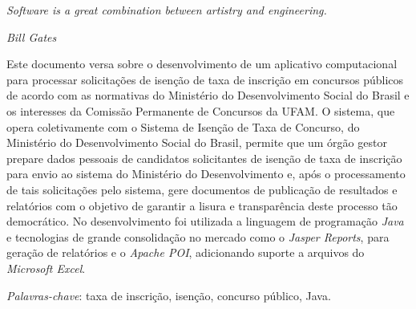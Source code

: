 \documentclass[
	12pt,			%
	openright,		%
	oneside,	
	a4paper,		%
	english,		%
	brazil			%
]{abntex2/abntex2}  %
\begin{document}
	\begin{epigrafe}
		
		\vspace*{\fill}
		\begin{flushright}
			
			\textit{Software is a great combination between artistry and engineering.}

			\textit{Bill Gates}
			
		\end{flushright}\vspace{4cm}
		
	\end{epigrafe}

	\setlength{\absparsep}{18pt}
	\begin{resumo}

		Este documento versa sobre o desenvolvimento de um aplicativo computacional para processar solicitações de isenção de taxa de inscrição em concursos públicos de acordo com as normativas do Ministério do Desenvolvimento Social do Brasil e os interesses da Comissão Permanente de Concursos da UFAM. O sistema, que opera coletivamente com o Sistema de Isenção de Taxa de Concurso, do Ministério do Desenvolvimento Social do Brasil, permite que um órgão gestor prepare dados pessoais de candidatos solicitantes de isenção de taxa de inscrição para envio ao sistema do Ministério do Desenvolvimento e, após o processamento de tais solicitações pelo sistema, gere documentos de publicação de resultados e relatórios com o objetivo de garantir a lisura e transparência deste processo tão democrático. No desenvolvimento foi utilizada a linguagem de programação \textit{Java} e tecnologias de grande consolidação no mercado como o \textit{Jasper Reports}, para geração de relatórios e o \textit{Apache POI}, adicionando suporte a arquivos do \textit{Microsoft Excel}.

		\vspace{\onelineskip}

		\noindent
		\textit{Palavras-chave}: taxa de inscrição, isenção, concurso público, Java.

	\end{resumo}
\end{document}
